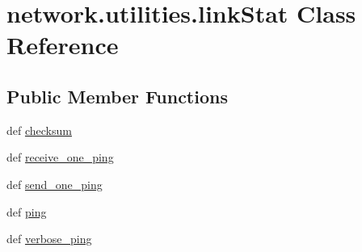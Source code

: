 \hypertarget{classnetwork_1_1utilities_1_1linkStat}{}\section{network.\+utilities.\+link\+Stat Class Reference}
\label{classnetwork_1_1utilities_1_1linkStat}
\subsection*{Public Member Functions}
\begin{DoxyCompactItemize}
\item 
def \hyperlink{classnetwork_1_1utilities_1_1linkStat_a30b4fe0361d0d934344d41b1ff05a9e4}{checksum}
\item 
def \hyperlink{classnetwork_1_1utilities_1_1linkStat_ab34b29051aaa298db40ae78ef8738179}{receive\+\_\+one\+\_\+ping}
\item 
def \hyperlink{classnetwork_1_1utilities_1_1linkStat_a9db67bf4097f75612005a9fd4df75fde}{send\+\_\+one\+\_\+ping}
\item 
def \hyperlink{classnetwork_1_1utilities_1_1linkStat_a40250efc17feca78b495dda25816497e}{ping}
\item 
def \hyperlink{classnetwork_1_1utilities_1_1linkStat_a6e84d4beb6f4411588ded2df04ffff3a}{verbose\+\_\+ping}
\end{DoxyCompactItemize}


